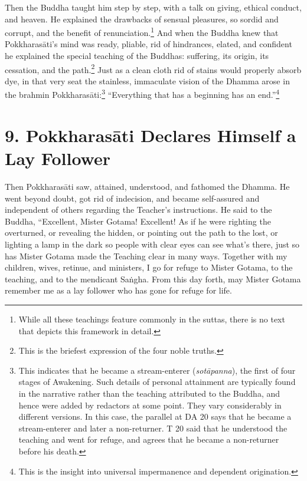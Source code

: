 \documentclass[12pt,openany]{book}%
\begin{document}
Then the Buddha taught him step by step, with a talk on giving, ethical conduct, and heaven. He explained the drawbacks of sensual pleasures, so sordid and corrupt, and the benefit of renunciation.\footnote{While all these teachings feature commonly in the suttas, there is no text that depicts this framework in detail. } And when the Buddha knew that \textsanskrit{Pokkharasāti}’s mind was ready, pliable, rid of hindrances, elated, and confident he explained the special teaching of the Buddhas: suffering, its origin, its cessation, and the path.\footnote{This is the briefest expression of the four noble truths. } Just as a clean cloth rid of stains would properly absorb dye, in that very seat the stainless, immaculate vision of the Dhamma arose in the brahmin \textsanskrit{Pokkharasāti}:\footnote{This indicates that he became a stream-enterer (\textit{\textsanskrit{sotāpanna}}), the first of four stages of Awakening. Such details of personal attainment are typically found in the narrative rather than the teaching attributed to the Buddha, and hence were added by redactors at some point. They vary considerably in different versions. In this case, the parallel at DA 20 says that he became a stream-enterer and later a non-returner. T 20 said that he understood the teaching and went for refuge, and agrees that he became a non-returner before his death. } “Everything that has a beginning has an end.”\footnote{This is the insight into universal impermanence and dependent origination. } 

\section*{9. \textsanskrit{Pokkharasāti} Declares Himself a Lay Follower }

Then \textsanskrit{Pokkharasāti} saw, attained, understood, and fathomed the Dhamma. He went beyond doubt, got rid of indecision, and became self-assured and independent of others regarding the Teacher’s instructions. He said to the Buddha, “Excellent, Mister Gotama! Excellent! As if he were righting the overturned, or revealing the hidden, or pointing out the path to the lost, or lighting a lamp in the dark so people with clear eyes can see what’s there, just so has Mister Gotama made the Teaching clear in many ways. Together with my children, wives, retinue, and ministers, I go for refuge to Mister Gotama, to the teaching, and to the mendicant \textsanskrit{Saṅgha}. From this day forth, may Mister Gotama remember me as a lay follower who has gone for refuge for life. 
\end{document}
